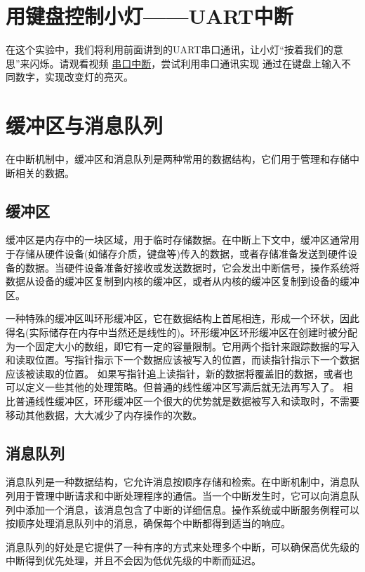 \section{用键盘控制小灯——UART中断}
在这个实验中，我们将利用前面讲到的UART串口通讯，让小灯“按着我们的意思”来闪烁。请观看视频
\href{https://www.bilibili.com/video/BV1bc411J7Tv/?p=10&share_source=copy_web&vd_source=00b9d329964a93c9843f9c524074f948}{串口中断}，尝试利用串口通讯实现
通过在键盘上输入不同数字，实现改变灯的亮灭。

\section{缓冲区与消息队列}
在中断机制中，缓冲区和消息队列是两种常用的数据结构，它们用于管理和存储中断相关的数据。
\subsection{缓冲区}
缓冲区是内存中的一块区域，用于临时存储数据。在中断上下文中，缓冲区通常用于存储从硬件设备(如储存介质，键盘等)传入的数据，或者存储准备发送到硬件设备的数据。当硬件设备准备好接收或发送数据时，它会发出中断信号，操作系统将数据从设备的缓冲区复制到内核的缓冲区，或者从内核的缓冲区复制到设备的缓冲区。

一种特殊的缓冲区叫环形缓冲区，它在数据结构上首尾相连，形成一个环状，因此得名(实际储存在内存中当然还是线性的)。环形缓冲区环形缓冲区在创建时被分配为一个固定大小的数组，即它有一定的容量限制。它用两个指针来跟踪数据的写入和读取位置。写指针指示下一个数据应该被写入的位置，而读指针指示下一个数据应该被读取的位置。
如果写指针追上读指针，新的数据将覆盖旧的数据，或者也可以定义一些其他的处理策略。但普通的线性缓冲区写满后就无法再写入了。
相比普通线性缓冲区，环形缓冲区一个很大的优势就是数据被写入和读取时，不需要移动其他数据，大大减少了内存操作的次数。
\subsection{消息队列}
消息队列是一种数据结构，它允许消息按顺序存储和检索。在中断机制中，消息队列用于管理中断请求和中断处理程序的通信。当一个中断发生时，它可以向消息队列中添加一个消息，该消息包含了中断的详细信息。操作系统或中断服务例程可以按顺序处理消息队列中的消息，确保每个中断都得到适当的响应。

消息队列的好处是它提供了一种有序的方式来处理多个中断，可以确保高优先级的中断得到优先处理，并且不会因为低优先级的中断而延迟。

